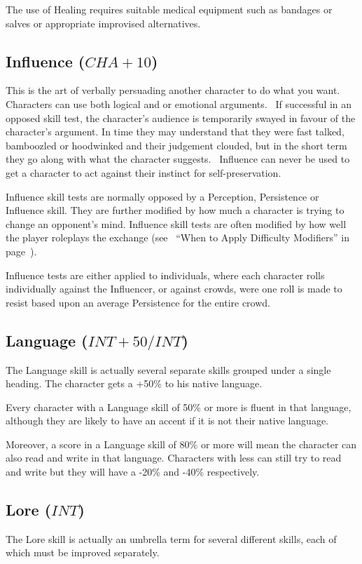 The use of Healing requires suitable medical equipment such as bandages or salves or appropriate improvised alternatives. 


\subsection{Influence ($CHA+10$)}
This is the art of verbally persuading another character to do what you want. Characters can use both logical and or emotional arguments.  If successful in an opposed skill test, the character’s audience is temporarily swayed in favour of the character’s argument. In time they may understand that they were fast talked, bamboozled or hoodwinked and their judgement clouded, but in the short term they go along with what the character suggests.  Influence can never be used to get a character to act against their instinct for self-preservation.

Influence skill tests are normally opposed by a Perception, Persistence or Influence skill. They are further modified by how much a character is trying to change an opponent’s mind. Influence skill tests are often modified by how well the player roleplays the exchange (see  “When to Apply Difficulty Modifiers” in page~\pageref{ssec:when-to-apply-difficulty-modifies}).

Influence tests are either applied to individuals, where each character rolls individually against the Influencer, or against crowds, were one roll is made to resist based upon an average Persistence for the entire crowd.


\subsection{Language ($INT+50/INT$)}
The Language skill is actually several separate skills grouped under a single heading. The character gets a +50\% to his native language.

Every character with a Language skill of 50\% or more is fluent in that language, although they are likely to have an accent if it is not their native language. 

Moreover, a score in a Language skill of 80\% or more will mean the character can also read and write in that language. Characters with less can still try to read and write but they will have a -20\% and -40\% respectively.


\subsection{Lore ($INT$)}
The Lore skill is actually an umbrella term for several different skills, each of which must be improved separately. 

